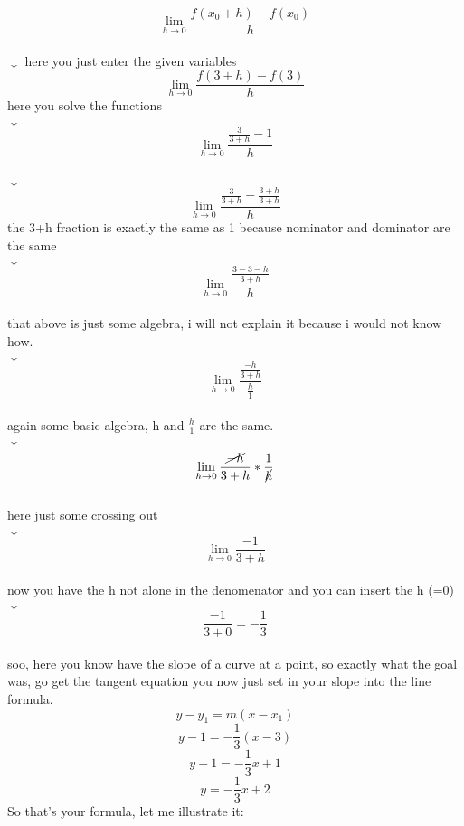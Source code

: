 \documentclass[11p]{article}
\begin{document}
\begin{center}
	\[\lim_{h \rightarrow 0} \frac{f(x_0+h)-f(x_0)}{h}\] \\
	$\downarrow$ here you just enter the given variables\\
	\[\lim_{h \rightarrow 0} \frac{f(3+h)-f(3)}{h}\] here you solve the functions \\
	$\downarrow$\\
	\[\lim_{h \rightarrow 0} \frac{\frac{3}{3+h}-1}{h}\]\\
	$\downarrow$\\
	\[\lim_{h \rightarrow 0} \frac{\frac{3}{3+h}-\frac{3+h}{3+h}}{h}\] the 3+h
	fraction is exactly the same as 1 because nominator and dominator are the same\\
	$\downarrow$\\
	\[\lim_{h \rightarrow 0} \frac{\frac{3-3-h}{3+h}}{h}\]\\
	that above is just some algebra, i will not explain it because i would not
	know how.\\
	$\downarrow$\\
\[\lim_{h \rightarrow 0} \frac{\frac{-h}{3+h}}{\frac{h}{1}}\]\\
	again some basic algebra, h and $\frac{h}{1}$ are the same.\\
	$\downarrow$\\
	\[\lim_{h \rightarrow 0}\frac{\cancel{-h}}{3+h}*\frac{1}{\cancel{h}} \]\\
	here just some crossing out\\
	$\downarrow$\\
	\[\lim_{h \rightarrow 0}\frac{-1}{3+h} \]\\
	now you have the h not alone in the denomenator and you can insert the h
	(=0)\\
	$\downarrow$\\
	\[\frac{-1}{3+0} = -\frac{1}{3}\]\\
soo, here you know have the slope of a curve at a point, so exactly what the
goal was, go get the tangent equation you now just set in your slope into the
line formula.\\
\clearpage
	\[y-y_1 =m(x-x_1)		\]
	\[y-1 =-\frac{1}{3}(x-3)		\]
	\[y-1 =-\frac{1}{3}x+1\]
	\[y=-\frac{1}{3}x+2\]
	So that's your formula, let me illustrate it:





\end{center}
\end{document}
